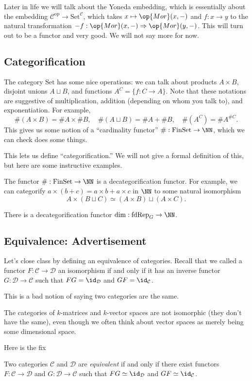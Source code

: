 \begin{remark}
	Later in life we will talk about the Yoneda embedding, which is essentially about the embedding $\mathcal C^\mathrm{op}\to\mathrm{Set}^\mathcal C$, which takes $x\mapsto\op{Mor}(x,-)$ and $f:x\to y$ to the natural transformation $-f:\op{Mor}(x,-)\Rightarrow\op{Mor}(y,-)$. This will turn out to be a functor and very good. We will not say more for now.
\end{remark}

\subsection{Categorification}
The category $\mathrm{Set}$ has some nice operations: we can talk about products $A\times B$, disjoint unions $A\sqcup B$, and functions $A^C=\{f:C\to A\}$. Note that these notations are suggestive of multiplication, addition (depending on whom you talk to), and exponentiation. For example,
\[\#(A\times B)=\#A\times\#B,\quad\#(A\sqcup B)=\#A+\#B,\quad\#\left(A^C\right)=\#A^{\#C}.\]
This gives us some notion of a ``cardinality functor'' $\#:\mathrm{FinSet}\to\NN$, which we can check does some things.

This lets us define ``categorification.'' We will not give a formal definition of this, but here are some instructive examples.
\begin{example}
	The functor $\#:\mathrm{FinSet}\to\NN$ is a decategorification functor. For example, we can categorify $a\times(b+c)=a\times b+a\times c$ in $\NN$ to some natural isomorphism
	\[A\times(B\sqcup C)\simeq (A\times B)\sqcup (A\times C).\]
\end{example}
\begin{example}
	There is a decategorification functor $\dim:\mathrm{fdRep}_G\to\NN$.
\end{example}

\subsection{Equivalence: Advertisement}
Let's close class by defining an equivalence of categories. Recall that we called a functor $F:\mathcal C\to\mathcal D$ an isomorphism if and only if it has an inverse functor $G:\mathcal D\to\mathcal C$ such that $FG=\id_\mathcal D$ and $GF=\id_\mathcal C$.

This is a bad notion of saying two categories are the same.
\begin{example}
	The categories of $k$-matrices and $k$-vector spaces are not isomorphic (they don't have the same), even though we often think about vector spaces as merely being some dimensional space.
\end{example}
Here is the fix
\begin{definition}[Equivalence]
	Two categories $\mathcal C$ and $\mathcal D$ are \textit{equivalent} if and only if there exist functors $F:\mathcal C\to\mathcal D$ and $G:\mathcal D\to\mathcal C$ such that $FG\simeq\id_{\mathcal D}$ and $GF\simeq\id_\mathcal C$.
\end{definition}